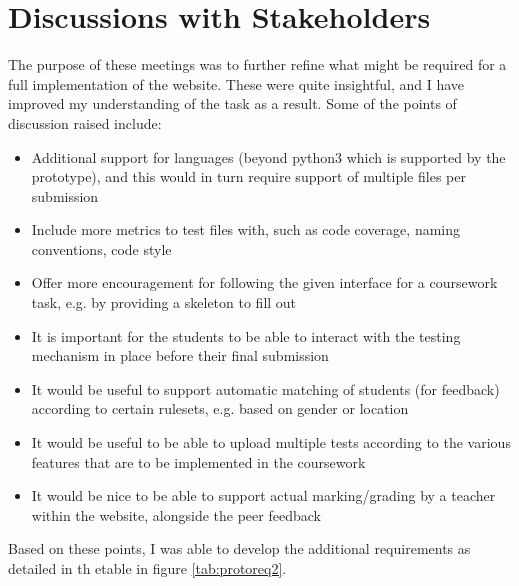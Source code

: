 \documentclass[a4paper,11pt]{report}
\begin{document}
\section{Discussions with Stakeholders}
The purpose of these meetings was to further refine what might be required for a full implementation of the website. These were quite insightful, and I have improved my understanding of the task as a result. Some of the points of discussion raised include:
\begin{itemize}
\item Additional support for languages (beyond python3 which is supported by the prototype), and this would in turn require support of multiple files per submission
\item Include more metrics to test files with, such as code coverage, naming conventions, code style
\item Offer more encouragement for following the given interface for a coursework task, e.g. by providing a skeleton to fill out
\item It is important for the students to be able to interact with the testing mechanism in place before their final submission
\item It would be useful to support automatic matching of students (for feedback) according to certain rulesets, e.g. based on gender or location
\item It would be useful to be able to upload multiple tests according to the various features that are to be implemented in the coursework
\item It would be nice to be able to support actual marking/grading by a teacher within the website, alongside the peer feedback
\end{itemize}
Based on these points, I was able to develop the additional requirements as detailed in th etable in figure \ref{tab:protoreq2}. 
\end{document}

